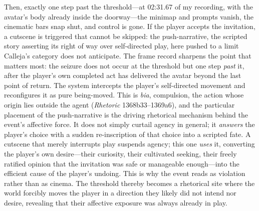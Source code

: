 \documentclass{article}
\begin{document}
Then, exactly one step past the threshold---at 02:31.67 of my recording, with the avatar's body already inside the doorway---the minimap and prompts vanish, the cinematic bars snap shut, and control is gone. If the player accepts the invitation, a cutscene is triggered that cannot be skipped: the push-narrative, the scripted story asserting its right of way over self-directed play, here pushed to a limit Calleja's category does not anticipate. The frame record sharpens the point that matters most: the seizure does not occur at the threshold but one step \textit{past} it, after the player's own completed act has delivered the avatar beyond the last point of return. The system intercepts the player's self-directed movement and reconfigures it as pure being-moved. This is \textit{bia}, compulsion, the action whose origin lies outside the agent (\textit{Rhetoric} 1368b33--1369a6), and the particular placement of the push-narrative is the driving rhetorical mechanism behind the event's affective force. It does not simply curtail agency in general; it \textit{answers} the player's choice with a sudden re-inscription of that choice into a scripted fate. A cutscene that merely interrupts play suspends agency; this one \textit{uses} it, converting the player's own desire---their curiosity, their cultivated seeking, their freely ratified opinion that the invitation was safe or manageable enough---into the efficient cause of the player's undoing. This is why the event reads as violation rather than as cinema. The threshold thereby becomes a rhetorical site where the world forcibly moves the player in a direction they likely did not intend nor desire, revealing that their affective exposure was always already in play.
\end{document}
